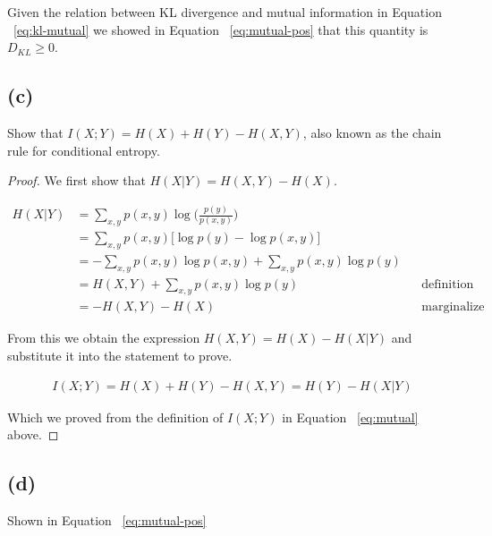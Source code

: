 \documentclass[11pt]{amsart}
\begin{document}
Given the relation between KL divergence and mutual information in Equation ~\ref{eq:kl-mutual} we showed in Equation ~\ref{eq:mutual-pos} that this quantity is $D_{KL} \geq 0$. 

\subsection{(c)}

Show that $I(X;Y) = H(X) + H(Y) - H(X,Y)$, also known as the chain rule for conditional entropy.

\begin{proof}

We first show that $H(X \vert Y) = H(X,Y) - H(X)$.

\begin{equation}
\begin{aligned}
H(X\vert Y) &= \sum_{x,y}p(x,y) \log \bigg( \frac{p(y)}{p(x,y)} \bigg) \\
		 &= \sum_{x,y} p(x,y) \bigg[\log p(y) - \log p(x,y) \bigg] \\
		 &= -\sum_{x,y}p(x,y) \log p(x,y) + \sum_{x,y} p(x,y) \log p(y) \\
		 &= H(X,Y) + \sum_{x,y} p(x,y) \log p(y) && \text{definition of entropy}\\
		 &= -H(X,Y) - H(X) 				      &&\text{marginalize out x as before}
\end{aligned}
\end{equation}

From this we obtain the expression $H(X,Y) = H(X) - H(X \vert Y)$ and substitute it into the statement to prove.

\begin{equation}
\begin{aligned}
I(X;Y) = H(X) + H(Y) - H(X,Y) = H(Y) - H(X \vert Y)
\end{aligned}
\end{equation}

Which we proved from the definition of $I(X;Y)$ in Equation ~\ref{eq:mutual} above.

\end{proof}

\subsection{(d)}

Shown in Equation ~\ref{eq:mutual-pos}
\end{document}

